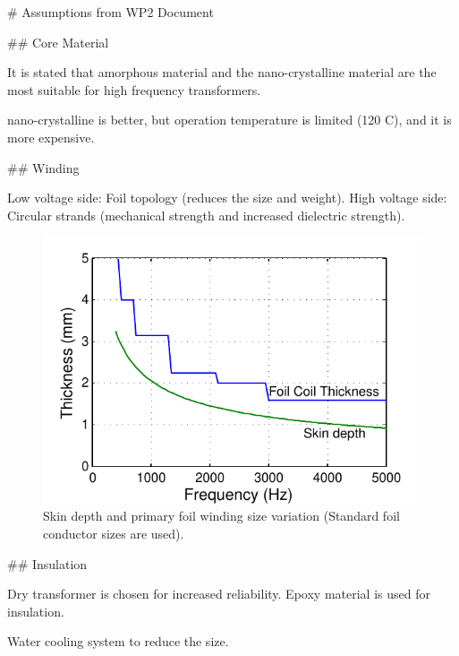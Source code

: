 \documentclass[a4paper, 11pt]{article} %
\begin{document}
# Assumptions from WP2 Document

## Core Material

It is stated that amorphous material and the nano-crystalline material are the most suitable for  high frequency transformers. 

nano-crystalline is better, but operation temperature is limited (120 C), and it is more expensive.


## Winding

Low voltage side: Foil topology (reduces the size and weight).
High voltage side: Circular strands (mechanical strength and increased dielectric strength).


\begin{figure}[]
  \centering
    \includegraphics[]{primary_thickness}
  \caption{Skin depth and primary foil winding size variation (Standard foil conductor sizes are used).}
  \label{primary_thickness}
\end{figure}

## Insulation 

Dry transformer is chosen for increased reliability. Epoxy material is used for insulation.

Water cooling system to reduce the size.




\clearpage


\end{document}
